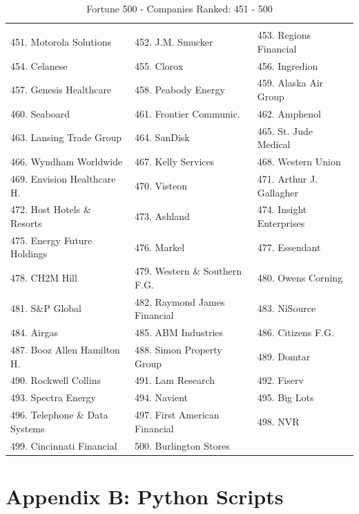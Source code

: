\documentclass{article}
\begin{document}
\begin{table}[H]
\centering
\caption{Fortune 500 - Companies Ranked: 451 - 500}
\begin{tabular}{lll}
\hline
 \\ 451. Motorola Solutions 
&  452. J.M. Smucker 
&  453. Regions Financial 
\\ 454. Celanese 
&  455. Clorox 
&  456. Ingredion 
\\ 457. Genesis Healthcare 
&  458. Peabody Energy 
&  459. Alaska Air Group 
\\ 460. Seaboard 
&  461. Frontier Communic. 
&  462. Amphenol 
\\ 463. Lansing Trade Group 
&  464. SanDisk 
&  465. St. Jude Medical 
\\ 466. Wyndham Worldwide 
&  467. Kelly Services 
&  468. Western Union 
\\ 469. Envision Healthcare H. 
&  470. Visteon 
&  471. Arthur J. Gallagher 
\\ 472. Host Hotels \& Resorts 
&  473. Ashland 
&  474. Insight Enterprises 
\\ 475. Energy Future Holdings 
&  476. Markel 
&  477. Essendant 
\\ 478. CH2M Hill 
&  479. Western \& Southern F.G. 
&  480. Owens Corning 
\\ 481. S\&P Global 
&  482. Raymond James Financial 
&  483. NiSource 
\\ 484. Airgas 
&  485. ABM Industries 
&  486. Citizens F.G.
\\ 487. Booz Allen Hamilton H. 
&  488. Simon Property Group 
&  489. Domtar 
\\ 490. Rockwell Collins 
&  491. Lam Research 
&  492. Fiserv 
\\ 493. Spectra Energy 
&  494. Navient 
&  495. Big Lots 
\\ 496. Telephone \& Data Systems 
&  497. First American Financial 
&  498. NVR 
\\ 499. Cincinnati Financial 
&  500. Burlington Stores 
&
 \\ \hline

\end{tabular}
\end{table}













\section{Appendix B: Python Scripts} \label{appP}
\end{document}
